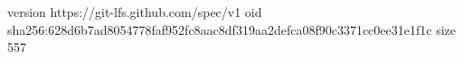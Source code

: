 version https://git-lfs.github.com/spec/v1
oid sha256:628d6b7ad8054778faf952fc8aac8df319aa2defca08f90c3371cc0ee31e1f1c
size 557
